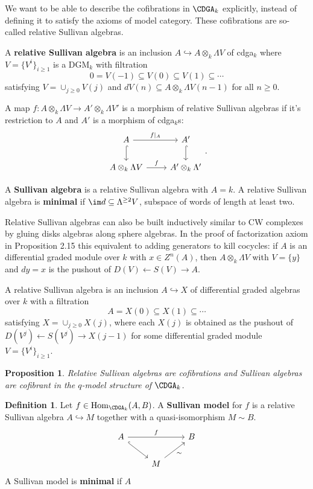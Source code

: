 \documentclass[psamsfonts]{amsart}
\newtheorem{prop}{Proposition}[section]
\theoremstyle{definition}
\newtheorem{defn}{Definition}[section]
\newcommand{\Hom}{\mathrm{Hom}}
\numberwithin{equation}{section}
\begin{document}
We want to be able to describe the cofibrations in $\CDGA_k$ explicitly, instead of defining it
to satisfy the axioms of model category. These cofibrations are so-called relative Sullivan algebras.

\begin{defns}
A \textbf{relative Sullivan algebra} is an inclusion $A\hookrightarrow A\otimes_k\Lambda V$ of cdga$_k$ where $V=\{V^i\}_{i\geq1}$ is a DGM$_k$ with filtration
\[0=V(-1)\subseteq V(0)\subseteq V(1)\subseteq\cdots\]
satisfying $V=\cup_{j\geq0}V(j)$ and $dV(n)\subseteq A\otimes_k\Lambda V(n-1)$ for all $n\geq0$.

A map $f:A\otimes_k\Lambda V\to A'\otimes_k\Lambda V'$ is a morphism of relative Sullivan algebras if it's restriction to $A$ and $A'$ is a morphism of cdga$_k$s:
\[\begin{tikzcd}
A\arrow[d,hookrightarrow]\arrow[r,"f|_A"]&A'\arrow[d,hookrightarrow]\\
A\otimes_k\Lambda V\arrow[r,"f"]&A'\otimes_k\Lambda'
\end{tikzcd}.\]

A \textbf{Sullivan algebra} is a relative Sullivan algebra with $A=k$. A relative Sullivan algebra is \textbf{minimal} if $\im d\subseteq\Lambda^{\geq2}V$, subspace of words of length at least two.
\end{defns}

Relative Sullivan algebras can also be built inductively similar to CW complexes by gluing disks algebras along sphere algebras. In the proof of factorization axiom in Proposition 2.15 this equivalent to adding generators to kill cocycles: if $A$ is an differential graded module over $k$ with $x\in Z^n(A)$, then $A\otimes_k\Lambda V$ with $V=\{y\}$ and $dy=x$ is the pushout of $D(V)\leftarrow S(V)\rightarrow A$.

A relative Sullivan algebra is an inclusion $A\hookrightarrow X$ of differential graded algebras over $k$ with a filtration
\[A=X(0)\subseteq X(1)\subseteq\cdots\]
satisfying $X=\cup_{j\geq0}X(j)$, where each $X(j)$ is obtained as the pushout of $D(V^j)\leftarrow S(V^j)\rightarrow X(j-1)$ for some differential graded module $V=\{V^i\}_{i\geq1}$.

\begin{prop}
Relative Sullivan algebras are cofibrations and Sullivan algebras are cofibrant in the $q$-model structure of $\CDGA_k$.
\end{prop}

\begin{defn}
Let $f\in\Hom_{\CDGA_k}(A,B)$. A \textbf{Sullivan model} for $f$ is a relative Sullivan algebra $A\hookrightarrow M$ together with a quasi-isomorphism $M\sim B$.
\[\begin{tikzcd}
A\arrow[dr,hookrightarrow]\arrow[rr,"f"]&&B\\
&M\arrow[ur,"\sim"']
\end{tikzcd}\]
A Sullivan model is \textbf{minimal} if $A$
\end{defn}
\end{document}
